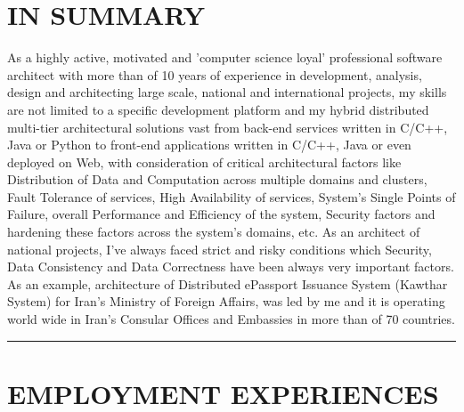 \documentclass[10pt,a4paper]{article}
\begin{document}
\thispagestyle{fancy}

\section{IN SUMMARY}
As a highly active, motivated and 'computer science loyal' professional software architect with more than of 10 years of experience in development, analysis, design and architecting large scale, national and international projects, my skills are not limited to a specific development platform and my hybrid distributed multi-tier architectural solutions vast from back-end services written in C/C++, Java or Python to front-end applications written in C/C++, Java or even deployed on Web, with consideration of critical architectural factors like Distribution of Data and Computation across multiple domains and clusters, Fault Tolerance of services, High Availability of services, System's Single Points of Failure, overall Performance and Efficiency of the system, Security factors and hardening these factors across the system's domains, etc. As an architect of national projects, I've always faced strict and risky conditions which Security, Data Consistency and Data Correctness have been always very important factors. As an example, architecture of Distributed ePassport Issuance System (Kawthar System) for Iran's Ministry of Foreign Affairs, was led by me and it is operating world wide in Iran's Consular Offices and Embassies in more than of 70 countries.

\rule {15cm}{0.4pt}

\section{EMPLOYMENT EXPERIENCES}
\end{document}
